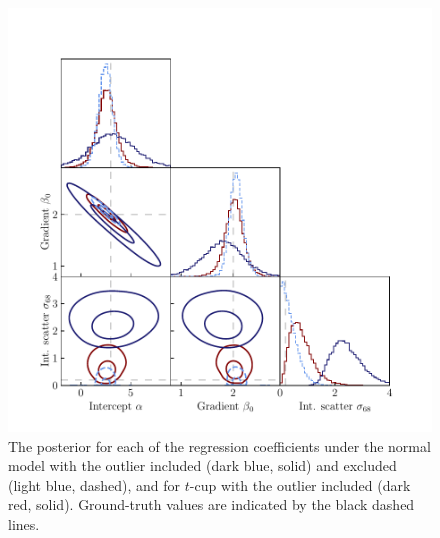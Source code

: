\documentclass[fleqn,usenatbib]{rasti}
\begin{document}
\begin{figure}
    \includegraphics[width=\columnwidth]{graphics/fixed/corner_outlier_ncup.pdf}
    \caption{The posterior for each of the regression coefficients under the
    normal model with the outlier included (dark blue, solid) and excluded
    (light blue, dashed), and for $t$-cup with the outlier included (dark red,
    solid). Ground-truth values are indicated by the black dashed lines.}
    \label{fig:results.outlier.corner}
\end{figure}
\end{document}
